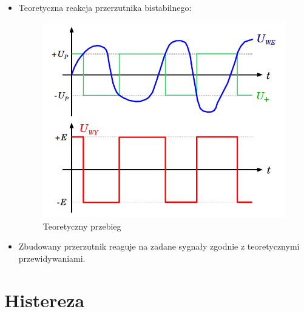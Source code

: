\begin{itemize}
\begin{figure}[H]
\begin{subfigure}[h]{0.49\textwidth}
                \caption*{Sygnał trójkątny}
            \end{subfigure}
        \end{figure}
    \item Teoretyczna reakcja przerzutnika bistabilnego:
        \begin{figure}[H]
            \centering
            \includegraphics[scale=0.5]{img/theoretical/przerzutnik_reakcja.png}
            \caption{Teoretyczny przebieg}
            \label{fig:my_label}
        \end{figure}
    \item Zbudowany przerzutnik reaguje na zadane sygnały zgodnie z teoretycznymi przewidywaniami.
\end{itemize}

\pagebreak

\section{Histereza}

